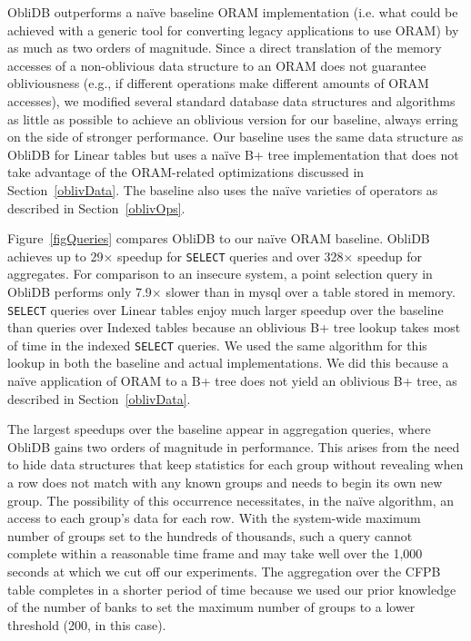 \documentclass[letterpaper,twocolumn,10pt]{article}
\def\name/{ObliDB}
\begin{document}
\name/ outperforms a na\"ive baseline ORAM implementation (i.e. what could be achieved with a generic tool for converting legacy applications to use ORAM) by as much as two orders of magnitude.  Since a direct translation of the memory accesses of a non-oblivious data structure to an ORAM does not guarantee obliviousness (e.g., if different operations make different amounts of ORAM accesses), we modified several standard database data structures and algorithms as little as possible to achieve an oblivious version for our baseline, always erring on the side of stronger performance. Our baseline uses the same data structure as \name/ for Linear tables but uses a na\"ive B+ tree implementation that does not take advantage of the ORAM-related optimizations discussed in Section~\ref{oblivData}. The baseline also uses the na\"ive varieties of operators as described in Section~\ref{oblivOps}.

Figure~\ref{figQueries} compares \name/ to our na\"ive ORAM baseline. \name/ achieves up to 29$\times$ speedup for \texttt{SELECT} queries and over 328$\times$ speedup for aggregates. For comparison to an insecure system, a point selection query in \name/ performs only 7.9$\times$ slower than in mysql over a table stored in memory. \texttt{SELECT} queries over Linear tables enjoy much larger speedup over the baseline than queries over Indexed tables because an oblivious B+ tree lookup takes most of time in the indexed \texttt{SELECT} queries. We used the same algorithm for this lookup in both the baseline and actual implementations. We did this because a na\"ive application of ORAM to a B+ tree does not yield an oblivious B+ tree, as described in Section~\ref{oblivData}.

The largest speedups over the baseline appear in aggregation queries, where \name/ gains two orders of magnitude in performance. This arises from the need to hide data structures that keep statistics for each group without revealing when a row does not match with any known groups and needs to begin its own new group. The possibility of this occurrence necessitates, in the na\"ive algorithm, an access to each group's data for each row. With the system-wide maximum number of groups set to the hundreds of thousands, such a query cannot complete within a reasonable time frame and may take well over the 1,000 seconds at which we cut off our experiments. The aggregation over the CFPB table completes in a shorter period of time because we used our prior knowledge of the number of banks to set the maximum number of groups to a lower threshold (200, in this case).
\end{document}

